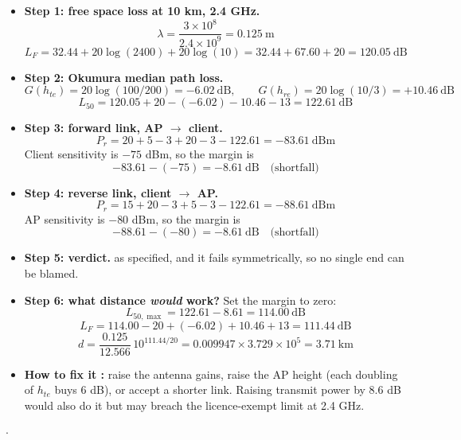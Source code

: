 \begin{itemize}
  \item \textbf{Step 1: free space loss at 10 km, 2.4 GHz.}
        \[ \lambda = \frac{3\times10^{8}}{2.4\times10^{9}} = 0.125\ \text{m} \]
        \[ L_F = 32.44 + 20\log(2400) + 20\log(10) = 32.44 + 67.60 + 20 = 120.05\ \text{dB} \]
  \item \textbf{Step 2: Okumura median path loss.}
        \[ G(h_{te}) = 20\log(100/200) = -6.02\ \text{dB}, \qquad
           G(h_{re}) = 20\log(10/3) = +10.46\ \text{dB} \]
        \[ L_{50} = 120.05 + 20 - (-6.02) - 10.46 - 13 = \boxed{122.61\ \text{dB}} \]
  \item \textbf{Step 3: forward link, AP $\rightarrow$ client.}
        \[ P_r = 20 + 5 - 3 + 20 - 3 - 122.61 = -83.61\ \text{dBm} \]
        Client sensitivity is $-75$ dBm, so the margin is
        \[ -83.61 - (-75) = \boxed{-8.61\ \text{dB}} \quad \text{(shortfall)} \]
  \item \textbf{Step 4: reverse link, client $\rightarrow$ AP.}
        \[ P_r = 15 + 20 - 3 + 5 - 3 - 122.61 = -88.61\ \text{dBm} \]
        AP sensitivity is $-80$ dBm, so the margin is
        \[ -88.61 - (-80) = \boxed{-8.61\ \text{dB}} \quad \text{(shortfall)} \]
  \item \textbf{Step 5: verdict.}
         as specified,
        and it fails symmetrically, so no single end can be blamed.
  \item \textbf{Step 6: what distance \emph{would} work?} Set the margin to zero:
        \[ L_{50,\max} = 122.61 - 8.61 = 114.00\ \text{dB} \]
        \[ L_F = 114.00 - 20 + (-6.02) + 10.46 + 13 = 111.44\ \text{dB} \]
        \[ d = \frac{0.125}{12.566}\,10^{111.44/20} = 0.009947 \times 3.729\times10^{5}
             = \boxed{3.71\ \text{km}} \]
  \item \textbf{How to fix it :} raise the antenna gains, raise the AP height
        (each doubling of $h_{te}$ buys 6 dB), or accept a shorter link. Raising transmit power by
        8.6 dB would also do it but may breach the licence-exempt limit at 2.4 GHz.
\end{itemize}

\hr

{\color{sub}\footnotesize {}  \gap$\cdot$\gap {}}

